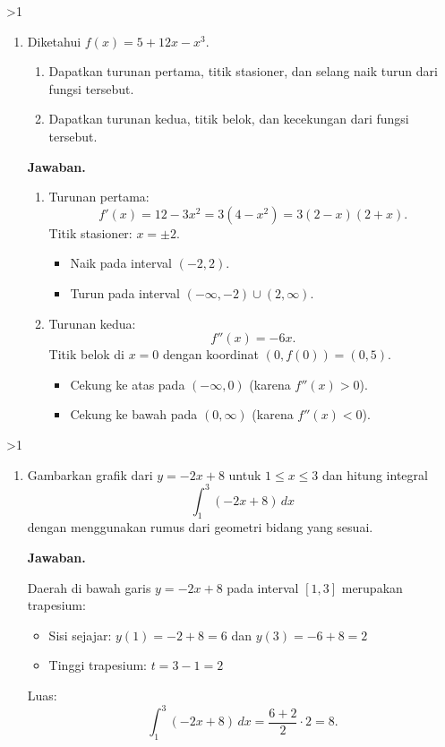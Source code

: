 \documentclass[12pt]{article}
\newcommand{\answername}{Jawaban}
\newenvironment{soaljawab}[1]{%
    \ifnum#1>1\clearpage\fi
    \begin{tcolorbox}[enhanced,breakable,height fill,height fixed for=all,
        sharp corners,colback=white,colframe=black,boxrule=0.4bp,
        boxsep=0pt,left=12bp,right=12bp,top=6bp,bottom=10bp,
        before skip=0pt,after skip=0pt,pad at break=8bp]
    \fontsize{12bp}{14bp}\selectfont
    \setlength{\abovedisplayskip}{8bp}
    \setlength{\belowdisplayskip}{8bp}
    \setlength{\abovedisplayshortskip}{8bp}
    \setlength{\belowdisplayshortskip}{8bp}
    \renewcommand{\arraystretch}{1.15}
    \begin{enumerate}[start=#1,topsep=0pt]
}{%
    \end{enumerate}
    \end{tcolorbox}
}
\newcommand{\jawaban}{\par\medskip\textbf{\answername.}\par\smallskip}
\begin{document}
\begin{soaljawab}{2}
\item Diketahui $f(x) = 5 + 12x - x^3$.
        \begin{enumerate}
          \item Dapatkan turunan pertama, titik stasioner, dan selang naik turun dari fungsi tersebut.
          \item Dapatkan turunan kedua, titik belok, dan kecekungan dari fungsi tersebut.
        \end{enumerate}
\jawaban
\begin{enumerate}
          \item Turunan pertama:
                \[
                  f'(x) = 12 - 3x^2 = 3(4 - x^2) = 3(2 - x)(2 + x).
                \]
                Titik stasioner: $x = \pm 2$.
                \begin{itemize}
                  \item Naik pada interval $(-2, 2)$.
                  \item Turun pada interval $(-\infty, -2) \cup (2, \infty)$.
                \end{itemize}
          \item Turunan kedua:
                \[
                  f''(x) = -6x.
                \]
                Titik belok di $x = 0$ dengan koordinat $(0, f(0)) = (0, 5)$.
                \begin{itemize}
                  \item Cekung ke atas pada $(-\infty, 0)$ (karena $f''(x) > 0$).
                  \item Cekung ke bawah pada $(0, \infty)$ (karena $f''(x) < 0$).
                \end{itemize}
        \end{enumerate}
\end{soaljawab}

\begin{soaljawab}{3}
\item Gambarkan grafik dari $y = -2x + 8$ untuk $1 \le x \le 3$ dan hitung integral
        \[
          \int_{1}^{3} (-2x + 8) \, dx
        \]
        dengan menggunakan rumus dari geometri bidang yang sesuai.
\jawaban
Daerah di bawah garis $y = -2x + 8$ pada interval $[1, 3]$ merupakan trapesium:
        \begin{itemize}
          \item Sisi sejajar: $y(1) = -2 + 8 = 6$ dan $y(3) = -6 + 8 = 2$
          \item Tinggi trapesium: $t = 3 - 1 = 2$
        \end{itemize}
        Luas:
        \[
          \int_{1}^{3} (-2x + 8) \, dx = \frac{6 + 2}{2} \cdot 2 = 8.
        \]
\end{soaljawab}
\end{document}
